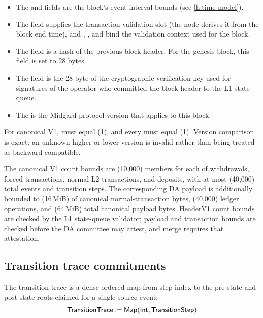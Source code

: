 \documentclass[../midgard.tex]{subfiles}
\begin{document}
\begin{itemize}
    \item The  and  fields are the block's event interval bounds (see \cref{h:time-model}).
    \item The  field supplies the transaction-validation slot (the node derives it from the block end time), and , , and  bind the validation context used for the block.
    \item The  field is a hash of the previous block header. For the genesis block, this field is set to 28  bytes.
    \item The  field is the 28-byte  of the cryptographic verification key used for signatures of the operator who committed the block header to the L1 state queue.
    \item The  is the Midgard protocol version that applies to this block.
\end{itemize}

For canonical V1,  must equal (1), and every
 must equal (1). Version comparison is
exact: an unknown higher or lower version is invalid rather than being treated
as backward compatible.

The canonical V1 count bounds are (10{,}000) members for each of withdrawals,
forced transactions, normal L2 transactions, and deposits, with at most
(40{,}000) total events and transition steps. The corresponding DA payload
is additionally bounded to (16\,MiB) of canonical normal-transaction
bytes, (40{,}000) ledger operations, and (64\,MiB) total canonical
payload bytes. HeaderV1 count bounds are checked by the L1 state-queue validator;
payload and transaction bounds are checked before the DA committee may attest,
and merge requires that attestation.

\subsection{Transition trace commitments}
\label{h:transition-trace-commitments}

The transition trace is a dense ordered map from step index to the pre-state and post-state roots claimed for a single source event:
\begin{equation*}
    \mathsf{TransitionTrace} \coloneq \mathsf{Map(Int, TransitionStep)}
\end{equation*}
\end{document}
